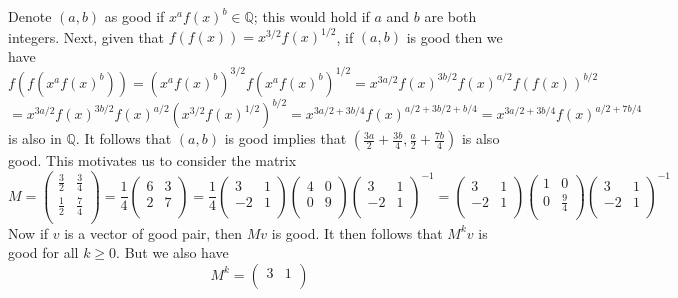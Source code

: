 \documentclass[11pt]{article}
\newcommand{\bbQ}{\mathbb Q}
\newcommand{\<}{\langle}
\renewcommand{\>}{\rangle}
\begin{document}
\begin{enumerate}
	Denote $(a, b)$ as good if $x^af(x)^b\in\bbQ$; this would hold if $a$ and $b$ are both integers. 
	Next, given that $f(f(x))=x^{3/2}f(x)^{1/2}$, if $(a, b)$ is good then we have 
	\[
	f(f(x^af(x)^b))=(x^af(x)^b)^{3/2}f(x^af(x)^b)^{1/2}
	=x^{3a/2}f(x)^{3b/2}f(x)^{a/2}f(f(x))^{b/2}
	\]
	\[
	=x^{3a/2}f(x)^{3b/2}f(x)^{a/2}(x^{3/2}f(x)^{1/2})^{b/2}
	=x^{3a/2+3b/4}f(x)^{a/2+3b/2+b/4}
	=x^{3a/2+3b/4}f(x)^{a/2+7b/4}
	\]
	is also in $\bbQ$. 
	It follows that $(a, b)$ is good implies that $\left(\frac{3a}{2}+\frac{3b}{4}, \frac{a}{2}+\frac{7b}{4}\right)$ is also good. 
	This motivates us to consider the matrix 
	\[
	M=
	\begin{pmatrix}
	  \frac 32 & \frac 34\\
	  \frac 12 & \frac 74\\
	\end{pmatrix}
	=\frac 14 \begin{pmatrix}
	 6 & 3\\
	2 & 7\\
	\end{pmatrix}
	=\frac14 
	\begin{pmatrix}
	3 & 1\\
	-2 & 1\\
	\end{pmatrix}
	\begin{pmatrix}
	4 & 0\\
	0 & 9\\
	\end{pmatrix}
	\begin{pmatrix}
	3 & 1\\
	-2 & 1\\
	\end{pmatrix}^{-1}
	= 
	\begin{pmatrix}
	3 & 1\\
	-2 & 1\\
	\end{pmatrix}
	\begin{pmatrix}
	1 & 0\\
	0 & \frac{9}{4}\\
	\end{pmatrix}
	\begin{pmatrix}
	3 & 1\\
	-2 & 1\\
	\end{pmatrix}^{-1}
	\]
	Now if $v$ is a vector of good pair, then $Mv$ is good. It then follows that $M^kv$ is good for all $k\ge 0$. But we also have 
	\[
	M^k
	=\begin{pmatrix}
	3 & 1\\

\end{pmatrix}\]
\end{enumerate}
\end{document}
